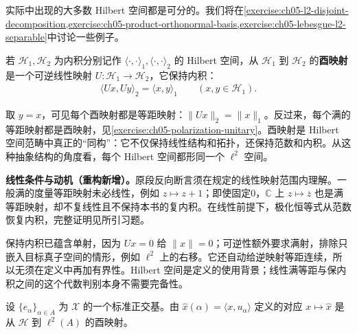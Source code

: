 \documentclass[../../main.tex]{subfiles}
\begin{document}
实际中出现的大多数 Hilbert 空间都是可分的。我们将在\cref{exercise:ch05-l2-disjoint-decomposition,exercise:ch05-product-orthonormal-basis,exercise:ch05-lebesgue-l2-separable}中讨论一些例子。
\begin{definition}[酉映射]\label{definition:ch05-unitary-map}
若 $\mathscr H_1,\mathscr H_2$ 为内积分别记作 $\langle\cdot,\cdot\rangle_1,\langle\cdot,\cdot\rangle_2$ 的 Hilbert 空间，从 $\mathscr H_1$ 到 $\mathscr H_2$ 的\textbf{酉映射}是一个可逆线性映射 $U:\mathscr H_1\to\mathscr H_2$，它保持内积：
\begin{align*}
\langle Ux,Uy\rangle_2=\langle x,y\rangle_1\qquad(x,y\in\mathscr H_1).
\end{align*}
\end{definition}
取 $y=x$，可见每个酉映射都是等距映射：$\|Ux\|_2=\|x\|_1$。反过来，每个满的等距映射都是酉映射，见\cref{exercise:ch05-polarization-unitary}。酉映射是 Hilbert 空间范畴中真正的“同构”：它不仅保持线性结构和拓扑，还保持范数和内积。从这种抽象结构的角度看，每个 Hilbert 空间都形同一个 $\ell^2$ 空间。
\begin{remark}
\textbf{线性条件与动机（重构新增）。}原段反向断言须在规定的线性映射范围内理解。一般满的度量等距映射未必线性，例如 $z\mapsto z+1$；即使固定0，$\mathbb C$ 上 $z\mapsto\overline z$ 也是满等距映射，却不复线性且不保持本书的复内积。在线性前提下，极化恒等式从范数恢复内积，完整证明见所引习题。

保持内积已蕴含单射，因为 $Ux=0$ 给 $\|x\|=0$；可逆性额外要求满射，排除只嵌入目标真子空间的情形，例如 $\ell^2$ 上的右移。它还自动给逆映射等距连续，所以无须在定义中再加有界性。Hilbert 空间是定义的使用背景；线性满等距与保内积之间的这个代数判别本身不需要完备性。
\end{remark}
\begin{proposition}\label{proposition:ch05-hilbert-ell2-unitary}
设 $\{e_\alpha\}_{\alpha\in A}$ 为 $\mathscr X$ 的一个标准正交基。由 $\widehat x(\alpha)=\langle x,u_\alpha\rangle$ 定义的对应 $x\mapsto\widehat x$ 是从 $\mathscr H$ 到 $\ell^2(A)$ 的酉映射。
\end{proposition}
\end{document}
